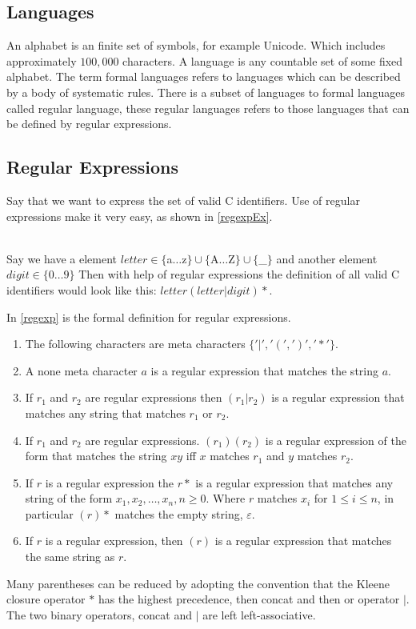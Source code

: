 \subsection{Languages}
An alphabet is an finite set of symbols, for example Unicode. Which 
includes approximately $100,000$ characters. A language is any 
countable set of some fixed alphabet. \cite{Aho2006}
The term formal languages refers to languages which can be described by a body 
of systematic rules. There is a subset of languages to formal languages called 
regular language, these regular languages refers to those languages 
that can be defined by regular expressions. \cite{Ranta2012}
\subsection{Regular Expressions}
Say that we want to express the set of valid C identifiers. Use of regular 
expressions make it very easy, as shown in \cref{regexpEx}. 
\begin{example}\label{regexpEx} \cite{Aho2006}\\
Say we have a element $letter \in \{$a$ \dots $z$\} \cup \{$A$ \dots $Z$\} \cup 
\{$\_$\}$
and another element $digit \in \{0 \dots 9\}$
Then with help of regular expressions the definition of all valid C identifiers 
would look like this: $letter (letter | digit)*$. 
\end{example}
In \cref{regexp} is the formal definition for regular expressions.
\begin{definition}\label{regexp} \cite{Aho1990}
\begin{enumerate}
  \item The following characters are meta characters $\{ '|', '(', ')', '*' \}$.
  \item A none meta character $a$ is a regular expression that matches the 
      string $a$.
  \item If $r_1$ and $r_2$ are regular expressions then $(r_1 | r_2)$ is a 
      regular expression that matches any string that matches $r_1$ or $r_2$.
  \item If $r_1$ and $r_2$ are regular expressions. $(r_1)(r_2)$ is a regular
      expression of the form that matches the string $xy$ iff $x$ matches $r_1$
      and $y$ matches $r_2$.
  \item If $r$ is a regular expression the $r*$ is a regular expression that
      matches any string of the form $x_1, x_2, \dots , x_n, n \geq 0$.
      Where $r$ matches $x_i$ for $1 \leq i \leq n$, in particular $(r)*$ 
      matches the empty string, $\varepsilon$.
  \item If $r$ is a regular expression, then $(r)$ is a regular expression that
      matches the same string as $r$.
\end{enumerate}
\end{definition}
Many parentheses can be reduced by adopting the convention that the Kleene
closure operator $*$ has the highest precedence, then concat and then or
operator $|$. The two binary operators, concat and $|$ are left 
left-associative. \cite{Aho1990}
